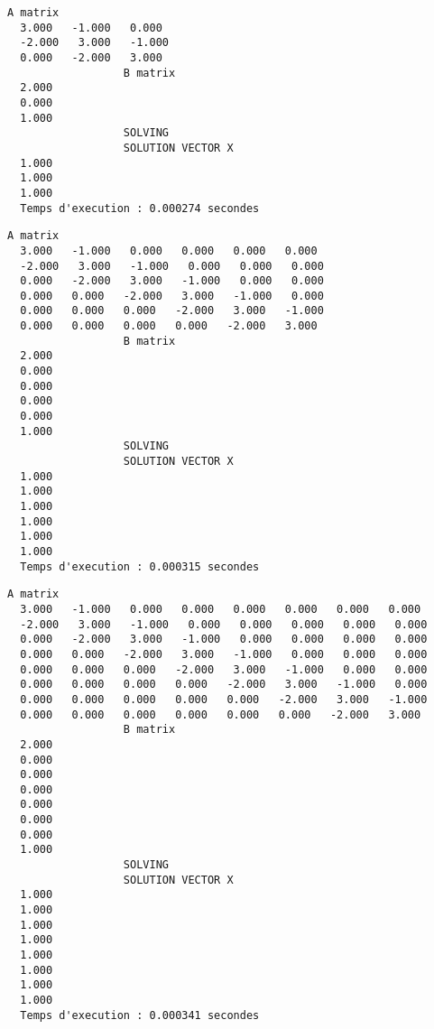 \begin{lstlisting}[caption={$A_9X=B$} results, basicstyle=\fontsize{8}{10}\selectfont]
                  A matrix
  3.000   -1.000   0.000   
  -2.000   3.000   -1.000   
  0.000   -2.000   3.000   
                  B matrix
  2.000   
  0.000   
  1.000   
                  SOLVING
                  SOLUTION VECTOR X 
  1.000   
  1.000   
  1.000   
  Temps d'execution : 0.000274 secondes
\end{lstlisting}

\begin{lstlisting}[caption={$A_10X=B$} results, basicstyle=\fontsize{8}{10}\selectfont]
                  A matrix
  3.000   -1.000   0.000   0.000   0.000   0.000   
  -2.000   3.000   -1.000   0.000   0.000   0.000   
  0.000   -2.000   3.000   -1.000   0.000   0.000   
  0.000   0.000   -2.000   3.000   -1.000   0.000   
  0.000   0.000   0.000   -2.000   3.000   -1.000   
  0.000   0.000   0.000   0.000   -2.000   3.000   
                  B matrix
  2.000   
  0.000   
  0.000   
  0.000   
  0.000   
  1.000   
                  SOLVING
                  SOLUTION VECTOR X 
  1.000   
  1.000   
  1.000   
  1.000   
  1.000   
  1.000   
  Temps d'execution : 0.000315 secondes
\end{lstlisting}

\begin{lstlisting}[caption={$A_11X=B$} results, basicstyle=\fontsize{5}{8}\selectfont]
                  A matrix
  3.000   -1.000   0.000   0.000   0.000   0.000   0.000   0.000   
  -2.000   3.000   -1.000   0.000   0.000   0.000   0.000   0.000   
  0.000   -2.000   3.000   -1.000   0.000   0.000   0.000   0.000   
  0.000   0.000   -2.000   3.000   -1.000   0.000   0.000   0.000   
  0.000   0.000   0.000   -2.000   3.000   -1.000   0.000   0.000   
  0.000   0.000   0.000   0.000   -2.000   3.000   -1.000   0.000   
  0.000   0.000   0.000   0.000   0.000   -2.000   3.000   -1.000   
  0.000   0.000   0.000   0.000   0.000   0.000   -2.000   3.000   
                  B matrix
  2.000   
  0.000   
  0.000   
  0.000   
  0.000   
  0.000   
  0.000   
  1.000   
                  SOLVING
                  SOLUTION VECTOR X 
  1.000   
  1.000   
  1.000   
  1.000   
  1.000   
  1.000   
  1.000   
  1.000   
  Temps d'execution : 0.000341 secondes
\end{lstlisting}

